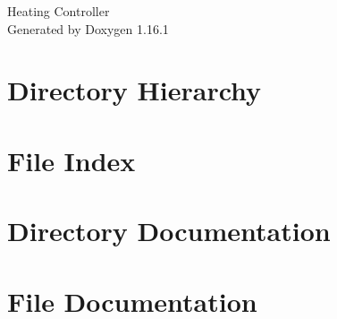 \documentclass[twoside]{book}
\newcommand{\+}{\discretionary{\mbox{\scriptsize$\hookleftarrow$}}{}{}}
\newcommand{\clearemptydoublepage}{%
    \newpage{\pagestyle{empty}\cleardoublepage}%
  }
\begin{document}
  \raggedbottom
    \hypersetup{pageanchor=false,
                bookmarksnumbered=true,
                pdfencoding=unicode
               }
  \begin{titlepage}
  \vspace*{7cm}
  \begin{center}%
  {\Large Heating Controller}\\
  \vspace*{1cm}
  {\large Generated by Doxygen 1.16.1}\\
  \end{center}
  \end{titlepage}
  \clearemptydoublepage
  \tableofcontents
  \clearemptydoublepage
  \hypersetup{pageanchor=true}

\chapter{Directory Hierarchy}

\chapter{File Index}

\chapter{Directory Documentation}

\chapter{File Documentation}

























  \backmatter
  \newpage
  \clearemptydoublepage
  \printindex
\end{document}
